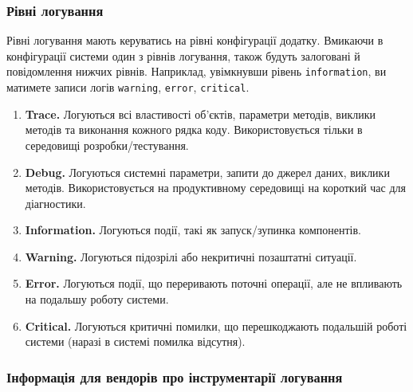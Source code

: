 \documentclass{article}
\begin{document}
\subsubsection{Рівні логування}

Рівні логування мають керуватись на рівні конфігурації додатку. Вмикаючи в конфігурації системи один з рівнів логування, також будуть залоговані й повідомлення нижчих рівнів. Наприклад, увімкнувши рівень \texttt{information}, ви матимете записи логів \texttt{warning}, \texttt{error}, \texttt{critical}.

\begin{enumerate}
    \item \textbf{Trace.} Логуються всі властивості об’єктів, параметри методів, виклики методів та виконання кожного рядка коду. Використовується тільки в середовищі розробки/тестування.
    \item \textbf{Debug.} Логуються системні параметри, запити до джерел даних, виклики методів. Використовується на продуктивному середовищі на короткий час для діагностики.
    \item \textbf{Information.} Логуються події, такі як запуск/зупинка компонентів.
    \item \textbf{Warning.} Логуються підозрілі або некритичні позаштатні ситуації.
    \item \textbf{Error.} Логуються події, що переривають поточні операції, але не впливають на подальшу роботу системи.
    \item \textbf{Critical.} Логуються критичні помилки, що перешкоджають подальшій роботі системи (наразі в системі помилка відсутня).
\end{enumerate}

\newpage
\subsubsection{Інформація для вендорів про інструментарії логування}
\end{document}
